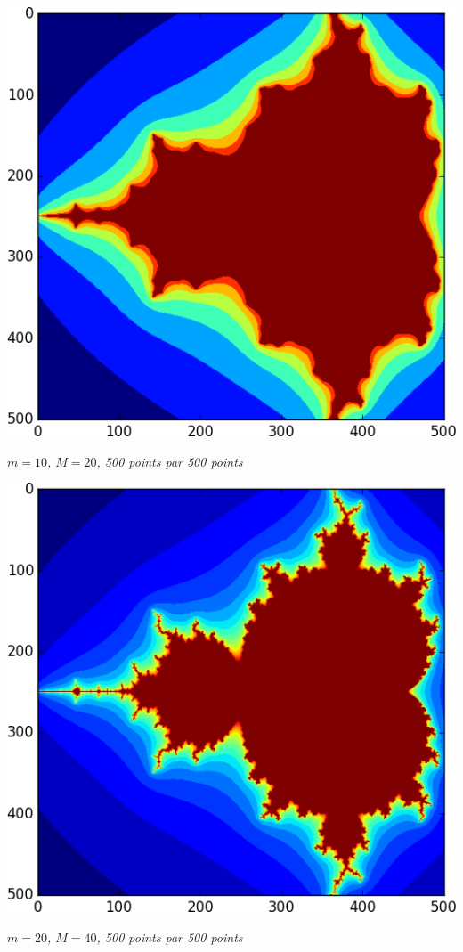 \documentclass[10pt,fleqn]{article} %
\begin{document}
\begin{multicols}{2}
\begin{center}
\includegraphics[width=.8\linewidth]{programmes/Exercice_09/10_20_500}

\textit{$m=10$, $M=20$, 500 points par 500 points}
\end{center}

\begin{center}
\includegraphics[width=.8\linewidth]{programmes/Exercice_09/20_40_500}

\textit{$m=20$, $M=40$, 500 points par 500 points}
\end{center}

\columnbreak 


\end{multicols}
\end{document}
